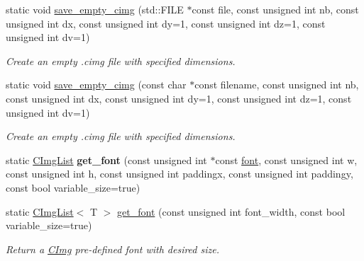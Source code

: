 \begin{DoxyCompactItemize}
\item 
\hypertarget{structcimg__library_1_1_c_img_list_acd8fec9f4b641d0e4f74f61c4e1ad446}{static void \hyperlink{structcimg__library_1_1_c_img_list_acd8fec9f4b641d0e4f74f61c4e1ad446}{save\-\_\-empty\-\_\-cimg} (std\-::\-F\-I\-L\-E $\ast$const file, const unsigned int nb, const unsigned int dx, const unsigned int dy=1, const unsigned int dz=1, const unsigned int dv=1)}\label{structcimg__library_1_1_c_img_list_acd8fec9f4b641d0e4f74f61c4e1ad446}

\begin{DoxyCompactList}\small\item\em Create an empty .cimg file with specified dimensions. \end{DoxyCompactList}\item 
\hypertarget{structcimg__library_1_1_c_img_list_a39f45ed8e0a41bb58852fcdcb2cdca77}{static void \hyperlink{structcimg__library_1_1_c_img_list_a39f45ed8e0a41bb58852fcdcb2cdca77}{save\-\_\-empty\-\_\-cimg} (const char $\ast$const filename, const unsigned int nb, const unsigned int dx, const unsigned int dy=1, const unsigned int dz=1, const unsigned int dv=1)}\label{structcimg__library_1_1_c_img_list_a39f45ed8e0a41bb58852fcdcb2cdca77}

\begin{DoxyCompactList}\small\item\em Create an empty .cimg file with specified dimensions. \end{DoxyCompactList}\item 
\hypertarget{structcimg__library_1_1_c_img_list_ab694de558d87ea194df9630f0c05f15a}{static \hyperlink{structcimg__library_1_1_c_img_list}{C\-Img\-List} {\bfseries get\-\_\-font} (const unsigned int $\ast$const \hyperlink{structcimg__library_1_1_c_img_list_a15831a333586e9ea8a6065455bb04ca8}{font}, const unsigned int w, const unsigned int h, const unsigned int paddingx, const unsigned int paddingy, const bool variable\-\_\-size=true)}\label{structcimg__library_1_1_c_img_list_ab694de558d87ea194df9630f0c05f15a}

\item 
static \hyperlink{structcimg__library_1_1_c_img_list}{C\-Img\-List}$<$ T $>$ \hyperlink{structcimg__library_1_1_c_img_list_aea5741eec2dd5c9234d13e14054659db}{get\-\_\-font} (const unsigned int font\-\_\-width, const bool variable\-\_\-size=true)
\begin{DoxyCompactList}\small\item\em Return a \hyperlink{structcimg__library_1_1_c_img}{C\-Img} pre-\/defined font with desired size. \end{DoxyCompactList}\end{DoxyCompactItemize}


